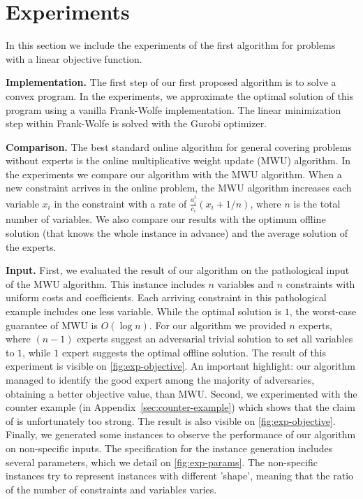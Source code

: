 
\section{Experiments} \label{sec:exp}

In this section we include the experiments of the first algorithm for problems with a linear objective function.

\textbf{Implementation.} The first step of our first proposed algorithm is to solve a convex program. In the experiments, we approximate the optimal solution of this program using a vanilla Frank-Wolfe implementation. The linear minimization step within Frank-Wolfe is solved with the Gurobi optimizer.

\textbf{Comparison.} The best standard online algorithm for general covering problems without experts is the online multiplicative weight update (MWU) algorithm. In the experiments we compare our algorithm with the MWU algorithm. When a new constraint arrives in the online problem, the MWU algorithm increases each variable $x_i$ in the constraint with a rate of $\frac{a^t_i}{c_i}(x_i + 1/n)$, where $n$ is the total number of variables. We also compare our results with the optimum offline solution (that knows the whole instance in advance) and the average solution of the experts.

\textbf{Input.} First, we evaluated the result of our algorithm on the pathological input of the MWU algorithm. This instance includes $n$ variables and $n$ constraints with uniform costs and coefficients. Each arriving constraint in this pathological example includes one less variable. While the optimal solution is $1$, the worst-case guarantee of MWU is $O(\log n)$. For our algorithm we provided $n$ experts, where $(n-1)$ experts suggest an adversarial trivial solution to set all variables to $1$, while $1$ expert suggests the optimal offline solution. The result of this experiment is visible on \cref{fig:exp-objective}. An important highlight: our algorithm managed to identify the good expert among the majority of adversaries, obtaining a better objective value, than MWU. Second, we experimented with the counter example (in Appendix~\ref{sec:counter-example}) which shows that the claim of \cite{AnandGe22:Online-Algorithms} is unfortunately too strong. The result is also visible on \cref{fig:exp-objective}. Finally, we generated some instances to observe the performance of our algorithm on non-specific inputs.
The specification for the instance generation includes several parameters, which we detail on \cref{fig:exp-params}. The non-specific instances try to represent instances with different 'shape', meaning that the ratio of the number of constraints and variables varies.

